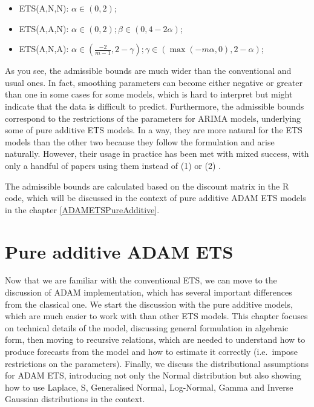 \documentclass[
]{book}
\providecommand{\tightlist}{%
  \setlength{\itemsep}{0pt}\setlength{\parskip}{0pt}}
\theoremstyle{definition}
\theoremstyle{definition}
\theoremstyle{definition}
\theoremstyle{definition}
\theoremstyle{remark}
\begin{document}
\begin{itemize}
\tightlist
\item
  ETS(A,N,N): \(\alpha \in (0, 2)\);
\item
  ETS(A,A,N): \(\alpha \in (0, 2); \beta \in (0, 4-2\alpha)\);
\item
  ETS(A,N,A): \(\alpha \in \left(\frac{-2}{m-1}, 2-\gamma\right); \gamma \in (\max(-m\alpha, 0), 2-\alpha)\);
\end{itemize}

As you see, the admissible bounds are much wider than the conventional and usual ones. In fact, smoothing parameters can become either negative or greater than one in some cases for some models, which is hard to interpret but might indicate that the data is difficult to predict. Furthermore, the admissible bounds correspond to the restrictions of the parameters for ARIMA models, underlying some of pure additive ETS models. In a way, they are more natural for the ETS models than the other two because they follow the formulation and arise naturally. However, their usage in practice has been met with mixed success, with only a handful of papers using them instead of (1) or (2) \citetext{\citealp[e.g.][]{Gardner2008}; \citealp[mention that they appear in some cases and][ use them in their model]{Snyder2017}}.

The admissible bounds are calculated based on the discount matrix in the R code, which will be discussed in the context of pure additive ADAM ETS models in the chapter \ref{ADAMETSPureAdditive}.

\hypertarget{ADAMETSIntroduction}{%
\chapter{Pure additive ADAM ETS}\label{ADAMETSIntroduction}}

Now that we are familiar with the conventional ETS, we can move to the discussion of ADAM implementation, which has several important differences from the classical one. We start the discussion with the pure additive models, which are much easier to work with than other ETS models. This chapter focuses on technical details of the model, discussing general formulation in algebraic form, then moving to recursive relations, which are needed to understand how to produce forecasts from the model and how to estimate it correctly (i.e.~impose restrictions on the parameters). Finally, we discuss the distributional assumptions for ADAM ETS, introducing not only the Normal distribution but also showing how to use Laplace, S, Generalised Normal, Log-Normal, Gamma and Inverse Gaussian distributions in the context.
\end{document}
